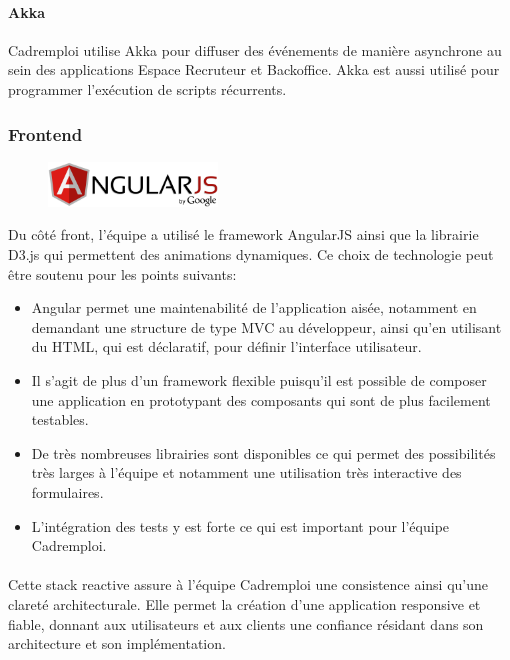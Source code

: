 \paragraph{Akka}
Cadremploi utilise Akka pour diffuser des événements de manière asynchrone au sein des applications Espace Recruteur et Backoffice.
Akka est aussi utilisé pour programmer l'exécution de scripts récurrents.

\subsubsection{Frontend}
\label{subs:Frontend}
\begin{figure}[h]
  \begin{center}
    \includegraphics[width=0.4\textwidth]{Pictures/angular_logo.png}
  \end{center}
\end{figure}
Du côté front, l'équipe a utilisé le framework AngularJS ainsi que la librairie D3.js qui permettent des animations dynamiques.
Ce choix de technologie peut être soutenu pour les points suivants:
\begin{itemize}
  \item Angular permet une maintenabilité de l'application aisée, notamment en demandant une structure de type MVC au développeur, ainsi qu'en utilisant du HTML, qui est déclaratif, pour définir l'interface utilisateur.
  \item Il s'agit de plus d'un framework flexible puisqu'il est possible de composer une application en prototypant des composants qui sont de plus facilement testables.
  \item De très nombreuses librairies sont disponibles ce qui permet des possibilités très larges à l'équipe et notamment une utilisation très interactive des formulaires.
  \item L'intégration des tests y est forte ce qui est important pour l'équipe Cadremploi.
\end{itemize}


\paragraph{}
Cette stack reactive assure à l'équipe Cadremploi une consistence ainsi qu'une clareté architecturale.
Elle permet la création d'une application responsive et fiable, donnant aux utilisateurs et aux clients une confiance résidant dans son architecture et son implémentation.

